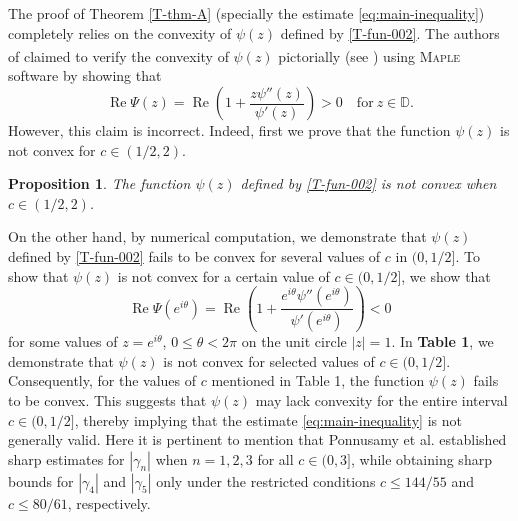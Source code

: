 \documentclass[a4paper,12pt]{amsart}
\newtheorem{pro}{Proposition}
\theoremstyle{definition}
\begin{document}
The proof of Theorem \ref{T-thm-A} (specially the estimate \eqref{eq:main-inequality}) completely relies on the convexity of $\psi(z)$ defined by \eqref{T-fun-002}. The authors of \cite{cho-Alimohammadi-2021} claimed to verify the convexity of $\psi(z)$ pictorially (see \cite[Fig. 1]{cho-Alimohammadi-2021}) using \textsc{Maple}\textsuperscript{\texttrademark} software by showing that
\begin{equation}\label{eq:convexity-condition}
\operatorname{Re}\Psi(z)= \operatorname{Re} \left( 1 + \frac{z \psi''(z)}{\psi'(z)} \right) > 0 \quad \text{for} ~ z \in \mathbb{D}.
\end{equation}
However, this claim is incorrect. Indeed, first we prove that the function $\psi(z)$ is not convex for $c \in (1/2, 2)$.


\begin{pro}\label{T-prop-001}
The function $\psi(z)$ defined by \eqref{T-fun-002} is not convex when $c \in (1/2, 2)$.
\end{pro}


On the other hand, by numerical computation, we demonstrate that $\psi(z)$ defined by \eqref{T-fun-002} fails to be convex for several values of $c$ in $(0, 1/2]$. To show that $\psi(z)$ is not convex for a certain value of $c\in (0, 1/2]$, we show that
$$
\operatorname{Re}\Psi(e^{i\theta})= \operatorname{Re}\left( 1 + \frac{e^{i\theta}\psi''(e^{i\theta})}{\psi'(e^{i\theta})} \right)<0
$$
for some values of $z=e^{i\theta}$, $0\le \theta<2\pi$ on the unit circle $|z|=1$.
In \textbf{Table 1}, we demonstrate that $\psi(z)$ is not convex for selected values of $c \in (0, 1/2]$. Consequently, for the values of $c$ mentioned in Table 1, the function $\psi(z)$ fails to be convex. This suggests that $\psi(z)$ may lack convexity for the entire interval $c \in (0, 1/2]$, thereby implying that the estimate \eqref{eq:main-inequality} is not generally valid. Here it is pertinent to mention that Ponnusamy et al. \cite{ponnusamy-Sharma-Wirths-2018} established sharp estimates for $|\gamma_n|$ when $n=1, 2, 3$ for all $c \in (0,3]$, while obtaining sharp bounds for $|\gamma_4|$ and $|\gamma_5|$ only under the restricted conditions $c \le 144/55$ and $c \le 80/61$, respectively.\\
\end{document}
